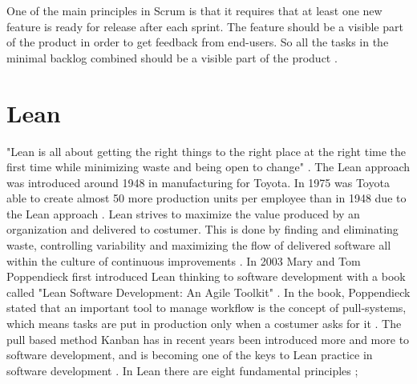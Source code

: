 \documentclass[UKenglish]{ifimaster}  %
\begin{document}
One of the main principles in Scrum is that it requires that at least one new feature is ready for release after each sprint. The feature should be a visible part of the product in order to get feedback from end-users. So all the tasks in the minimal backlog combined should be a visible part of the product \parencite{Scrum}.


\section {Lean}
\label{sec:Lean}
"Lean is all about getting the right things to the right place at the right time the first time while minimizing waste and being open to change" \parencite{741480}.
The Lean approach was introduced around 1948 in manufacturing for Toyota.  In 1975 was Toyota able to create almost 50 more production units per employee than in 1948 due to the Lean approach \parencite{manning}. Lean strives to maximize the value produced by an organization and delivered to costumer. This is done by finding and eliminating waste, controlling variability and maximizing the flow of delivered software all within the culture of continuous improvements \parencite{DavidAnderson}. In 2003 Mary and Tom Poppendieck first introduced Lean thinking to software development with a book called "Lean Software Development: An Agile Toolkit" \parencite{Lean:2003}. In the book, Poppendieck stated that an important tool to manage workflow is the concept of pull-systems, which means tasks are put in production only when a costumer asks for it \parencite{Lean:2009}.
The pull based method Kanban has in recent years been introduced more and more to software development, and is becoming one of the keys to Lean practice in software development \parencite{DavidAnderson}. In Lean there are eight fundamental principles \parencite{poppendieck2003lean};
\end{document}
